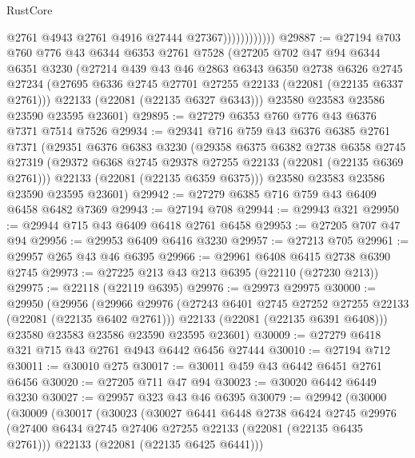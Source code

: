 \begin{lexlean}{RustCore}
\begin{coremodule}
                            @2761
                            @4943
                            @2761
                            @4916
                            @27444
                            @27367))))))))))))
@29887 := @27194
    @703
    @760
    @776
    @43
    @6344
    @6353
    @2761
    @7528
    (@27205
      @702
      @47
      @94
      @6344
      @6351
      @3230
      (@27214
        @439
        @43
        @46
        @2863
        @6343
        @6350
        @2738
        @6326
        @2745
        @27234
        (@27695 @6336 @2745 @27701 @27255 @22133 (@22081 (@22135 @6337 @2761)))
        @22133
        (@22081 (@22135 @6327 @6343)))
      @23580
      @23583
      @23586
      @23590
      @23595
      @23601)
@29895 := @27279 @6353 @760 @776 @43 @6376 @7371 @7514 @7526
@29934 := @29341
    @716
    @759
    @43
    @6376
    @6385
    @2761
    @7371
    (@29351
      @6376
      @6383
      @3230
      (@29358
        @6375
        @6382
        @2738
        @6358
        @2745
        @27319
        (@29372 @6368 @2745 @29378 @27255 @22133 (@22081 (@22135 @6369 @2761)))
        @22133
        (@22081 (@22135 @6359 @6375)))
      @23580
      @23583
      @23586
      @23590
      @23595
      @23601)
@29942 := @27279 @6385 @716 @759 @43 @6409 @6458 @6482 @7369
@29943 := @27194 @708
@29944 := @29943 @321
@29950 := @29944 @715 @43 @6409 @6418 @2761 @6458
@29953 := @27205 @707 @47 @94
@29956 := @29953 @6409 @6416 @3230
@29957 := @27213 @705
@29961 := @29957 @265 @43 @46 @6395
@29966 := @29961 @6408 @6415 @2738 @6390 @2745
@29973 := @27225 @213 @43 @213 @6395 (@22110 (@27230 @213))
@29975 := @22118 (@22119 @6395)
@29976 := @29973 @29975
@30000 := @29950
    (@29956
      (@29966
        @29976
        (@27243 @6401 @2745 @27252 @27255 @22133 (@22081 (@22135 @6402 @2761)))
        @22133
        (@22081 (@22135 @6391 @6408)))
      @23580
      @23583
      @23586
      @23590
      @23595
      @23601)
@30009 := @27279 @6418 @321 @715 @43 @2761 @4943 @6442 @6456 @27444
@30010 := @27194 @712
@30011 := @30010 @275
@30017 := @30011 @459 @43 @6442 @6451 @2761 @6456
@30020 := @27205 @711 @47 @94
@30023 := @30020 @6442 @6449 @3230
@30027 := @29957 @323 @43 @46 @6395
@30079 := @29942
    (@30000
      (@30009
        (@30017
          (@30023
            (@30027
              @6441
              @6448
              @2738
              @6424
              @2745
              @29976
              (@27400 @6434 @2745 @27406 @27255 @22133 (@22081 (@22135 @6435 @2761)))
              @22133
              (@22081 (@22135 @6425 @6441)))

\end{coremodule}
\end{lexlean}
